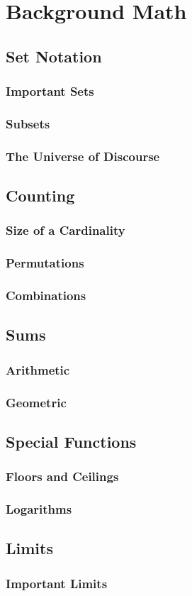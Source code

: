 \section{Background Math}

\subsection{Set Notation}
\subsubsection{Important Sets}
\subsubsection{Subsets}
\subsubsection{The Universe of Discourse}

\subsection{Counting}
\subsubsection{Size of a Cardinality}
\subsubsection{Permutations}
\subsubsection{Combinations}

\subsection{Sums}
\subsubsection{Arithmetic}
\subsubsection{Geometric}

\subsection{Special Functions}
\subsubsection{Floors and Ceilings}
\subsubsection{Logarithms}

\subsection{Limits}
\subsubsection{Important Limits}